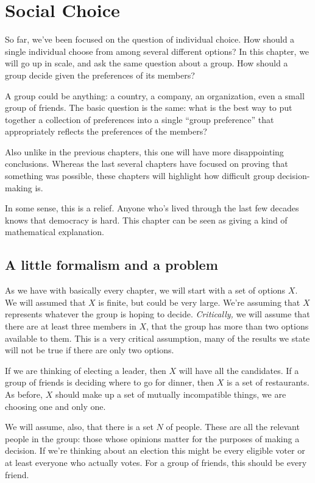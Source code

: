 \chapter{Social Choice}
\label{c:social-choice}

So far, we've been focused on the question of individual choice.  How should a single individual choose from among several different options?  In this chapter, we will go up in scale, and ask the same question about a group.  How should a group  decide given the preferences of its members?

A group could be anything: a country, a company, an organization, even a small group of friends.  The basic question is the same: what is the best way to put together a collection of preferences into a single ``group preference'' that appropriately reflects the preferences of the members?

Also unlike in the previous chapters, this one will have more disappointing conclusions.  Whereas the last several chapters have focused on proving that something was possible, these chapters will highlight how difficult group decision-making is.  

In some sense, this is a relief.  Anyone who's lived through the last few decades knows that democracy is hard.  This chapter can be seen as giving a kind of mathematical explanation.

\section{A little formalism and a problem}

As we have with basically every chapter, we will start with a set of options $X$.  We will assumed that $X$ is finite, but could be very large. We're assuming that $X$ represents whatever the group is hoping to decide. {\it Critically,} we will assume that there are at least three members in $X$, that the group has more than two options available to them.  This is a very critical assumption, many of the results we state will not be true if there are only two options.

If we are thinking of electing a leader, then $X$ will have all the candidates.  If a group of friends is deciding where to go for dinner, then $X$ is a set of restaurants.  As before, $X$ should make up a set of mutually incompatible things, we are choosing one and only one.

We will assume, also, that there is a set $N$ of people.  These are all the relevant people in the group: those whose opinions matter for the purposes of making a decision. If we're thinking about an election this might be every eligible voter or at least everyone who actually votes. For a group of friends, this should be every friend.  


